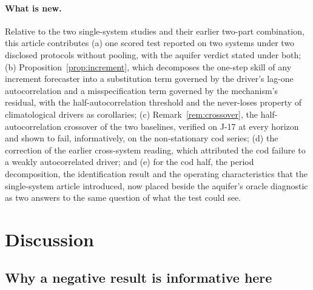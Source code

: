 \documentclass[preprint,11pt,authoryear]{elsarticle}
\theoremstyle{definition}
\theoremstyle{remark}
\begin{document}
\paragraph{What is new.} Relative to the two single-system studies and their earlier two-part combination, this article contributes (a) one scored test reported on two systems under two disclosed protocols without pooling, with the aquifer verdict stated under both; (b) Proposition~\ref{prop:increment}, which decomposes the one-step skill of any increment forecaster into a substitution term governed by the driver's lag-one autocorrelation and a misspecification term governed by the mechanism's residual, with the half-autocorrelation threshold and the never-loses property of climatological drivers as corollaries; (c) Remark~\ref{rem:crossover}, the half-autocorrelation crossover of the two baselines, verified on J-17 at every horizon and shown to fail, informatively, on the non-stationary cod series; (d) the correction of the earlier cross-system reading, which attributed the cod failure to a weakly autocorrelated driver; and (e) for the cod half, the period decomposition, the identification result and the operating characteristics that the single-system article introduced, now placed beside the aquifer's oracle diagnostic as two answers to the same question of what the test could see.
\FloatBarrier
\section{Discussion}\label{sec:discussion}

\subsection{Why a negative result is informative here}\label{sec:whyinformative}
\end{document}
